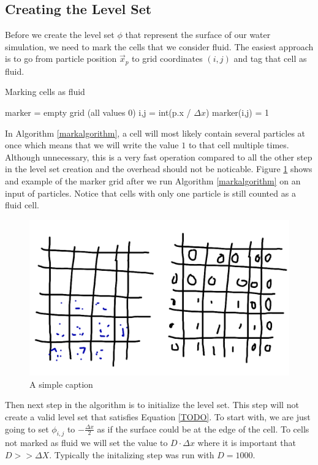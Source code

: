 \subsection{Creating the Level Set}

Before we create the level set $\phi$ that represent the surface of our water simulation, we need to mark the cells that we consider fluid. The easiest approach is to go from particle position $\vec{x}_p$ to grid coordinates $(i,j)$ and tag that cell as fluid.

\begin{algorithm}
\caption{Marking cells as fluid}
\begin{algorithmic}
\STATE marker = empty grid (all values 0)
\STATE i,j = int(p.x / $\Delta x$)
\STATE marker(i,j) = 1
\ENDFOR
\end{algorithmic}
\label{markalgorithm}
\end{algorithm}

In Algorithm \ref{markalgorithm}, a cell will most likely contain several particles at once which means that we will write the value $1$ to that cell multiple times. Although unnecessary, this is a very fast operation compared to all the other step in the level set creation and the overhead should not be noticable. Figure \ref{markerexample} shows and example of the marker grid after we run Algorithm \ref{markalgorithm} on an input of particles. Notice that cells with only one particle is still counted as a fluid cell.

\begin{figure}[ht!]
\centering
\includegraphics[width=130mm]{ch4/marker.png}
\caption{A simple caption}
\label{markerexample}
\end{figure}

Then next step in the algorithm is to initialize the level set. This step will not create a valid level set that satisfies Equation \ref{TODO}. To start with, we are just going to set $\phi_{i,j}$ to $-\frac{\Delta x}{2}$ as if the surface could be at the edge of the cell. To cells not marked as fluid we will set the value to $D \cdot \Delta x$ where it is important that $D >> \Delta X$. Typically the initalizing step was run with $D = 1000$.

